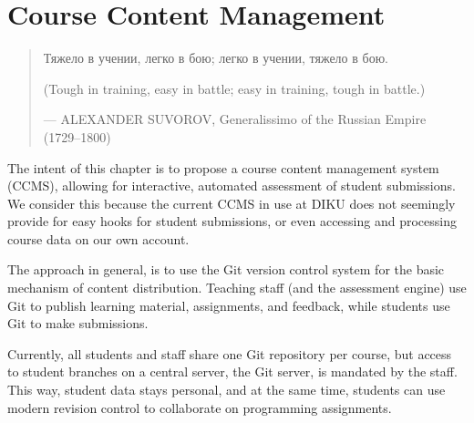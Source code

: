 
\chapter{Course Content Management}

\label{section:infrastructure}

\begin{quotation}

\footnotesize\sffamily\itshape

\begin{flushright}


Тяжело в учении, легко в бою; легко в учении, тяжело в бою.


\smallbreak

(Tough in training, easy in battle; easy in training, tough in battle.)

\smallbreak

\upshape

--- ALEXANDER SUVOROV, Generalissimo of the Russian Empire (1729--1800)

\end{flushright}

\end{quotation}

The intent of this chapter is to propose a course content management system
(CCMS), allowing for interactive, automated assessment of student submissions.
We consider this because the current CCMS in use at DIKU does not seemingly
provide for easy hooks for student submissions, or even accessing and
processing course data on our own account.

The approach in general, is to use the Git version control system for the basic
mechanism of content distribution. Teaching staff (and the assessment engine)
use Git to publish learning material, assignments, and feedback, while students
use Git to make submissions.

Currently, all students and staff share one Git repository per course, but
access to student branches on a central server, the Git server, is mandated by
the staff. This way, student data stays personal, and at the same time,
students can use modern revision control to collaborate on programming
assignments.


